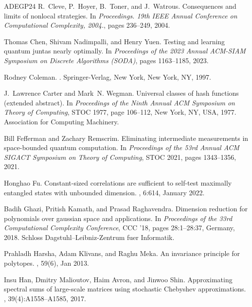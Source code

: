 \documentclass[10pt,a4paper]{article}
\theoremstyle{plain}
\theoremstyle{definition}
\newcommand{\1}{\mathbb{1}} %
\begin{document}
\begin{thebibliography}{ADEGP24}
R.~Cleve, P.~Hoyer, B.~Toner, and J.~Watrous.
\newblock Consequences and limits of nonlocal strategies.
\newblock In {\em Proceedings. 19th IEEE Annual Conference on Computational
  Complexity, 2004.}, pages 236--249, 2004.

Thomas Chen, Shivam Nadimpalli, and Henry Yuen.
\newblock Testing and learning quantum juntas nearly optimally.
\newblock In {\em Proceedings of the 2023 Annual ACM-SIAM Symposium on Discrete
  Algorithms (SODA)}, pages 1163--1185, 2023.

Rodney Coleman.
.
\newblock Springer-Verlag, New York, New York, NY, 1997.

J.~Lawrence Carter and Mark~N. Wegman.
\newblock Universal classes of hash functions (extended abstract).
\newblock In {\em Proceedings of the Ninth Annual ACM Symposium on Theory of
  Computing}, STOC 1977, page 106–112, New York, NY, USA, 1977. Association
  for Computing Machinery.

Bill Fefferman and Zachary Remscrim.
\newblock Eliminating intermediate measurements in space-bounded quantum
  computation.
\newblock In {\em Proceedings of the 53rd Annual ACM SIGACT Symposium on Theory
  of Computing}, STOC 2021, pages 1343--1356, 2021.

Honghao Fu.
\newblock Constant-sized correlations are sufficient to self-test maximally
  entangled states with unbounded dimension.
, 6:614, January 2022.

Badih Ghazi, Pritish Kamath, and Prasad Raghavendra.
\newblock Dimension reduction for polynomials over gaussian space and
  applications.
\newblock In {\em Proceedings of the 33rd Computational Complexity Conference},
  CCC '18, pages 28:1--28:37, Germany, 2018. Schloss Dagstuhl--Leibniz-Zentrum
  fuer Informatik.

Prahladh Harsha, Adam Klivans, and Raghu Meka.
\newblock An invariance principle for polytopes.
, 59(6), Jan 2013.

Insu Han, Dmitry Malioutov, Haim Avron, and Jinwoo Shin.
\newblock Approximating spectral sums of large-scale matrices using stochastic
  {C}hebyshev approximations.
, 39(4):A1558--A1585, 2017.


\end{thebibliography}
\end{document}
